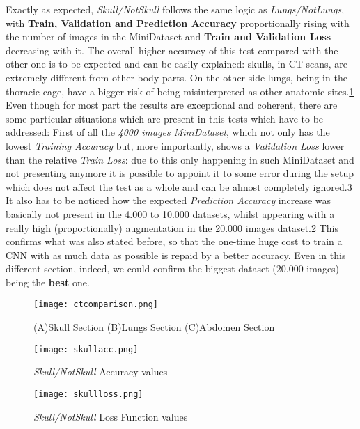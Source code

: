 \documentclass[../main.tex]{subfiles}
\begin{document}
Exactly as expected, \textit{Skull/NotSkull} follows the same logic as \textit{Lungs/NotLungs}, with \textbf{Train, Validation and Prediction Accuracy} proportionally rising with the number of images in the MiniDataset and \textbf{Train and Validation Loss} decreasing with it. The overall higher accuracy of this test compared with the other one is to be expected and can be easily explained: skulls, in CT scans, are extremely different from other body parts. On the other side lungs, being in the thoracic cage, have a bigger risk of being misinterpreted as other anatomic sites.\ref{fig:ctcomparison} \\
Even though for most part the results are exceptional and coherent, there are some particular situations which are present in this tests which have to be addressed: First of all the \textit{4000 images MiniDataset}, which not only has the lowest \textit{Training Accuracy} but, more importantly, shows a \textit{Validation Loss} lower than the relative \textit{Train Loss}: due to this only happening in such MiniDataset and not presenting anymore it is possible to appoint it to some error during the setup which does not affect the test as a whole and can be almost completely ignored.\ref{fig:skullloss} It also has to be noticed how the expected \textit{Prediction Accuracy} increase was basically not present in the 4.000 to 10.000 datasets, whilst appearing with a really high (proportionally) augmentation in the 20.000 images dataset.\ref{fig:skullacc} This confirms what was also stated before, so that the one-time huge cost to train a CNN with as much data as possible is repaid by a better accuracy. Even in this different section, indeed, we could confirm the biggest dataset (20.000 images) being the \textbf{best} one. 

\begin{figure}[h!b]
	\centering
	\texttt{[image: ctcomparison.png]}
	\caption{(A)Skull Section (B)Lungs Section (C)Abdomen Section}
	\label{fig:ctcomparison}
\end{figure}

\begin{figure}[h!b]
	\centering
	\texttt{[image: skullacc.png]}
	\caption{\textit{Skull/NotSkull} Accuracy values}
	\label{fig:skullacc}
\end{figure}


\begin{figure}[h!b]
	\centering
	\texttt{[image: skullloss.png]}
	\caption{\textit{Skull/NotSkull} Loss Function values}
	\label{fig:skullloss}
\end{figure}
\end{document}
